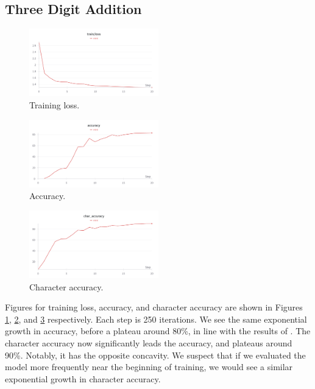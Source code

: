 \documentclass[12pt]{article}
\begin{document}
\subsection{Three Digit Addition}
\begin{figure}[h]
    \centering
    \includegraphics[width=0.5\textwidth]{figures/three-digit/three-digit-add-loss.png}
    \caption{Training loss.}
    \label{fig:three_digit_addition}
\end{figure}
\begin{figure}[h]
    \centering
    \includegraphics[width=0.5\textwidth]{figures/three-digit/three-digit-add-accuracy.png}
    \caption{Accuracy.}
    \label{fig:three_digit_addition_accuracy}
\end{figure}
\begin{figure}[h]
    \centering
    \includegraphics[width=0.5\textwidth]{figures/three-digit/three-digit-add-char-accuracy.png}
    \caption{Character accuracy.}
    \label{fig:three_digit_addition_char_accuracy}
\end{figure}
Figures for training loss, accuracy, and character accuracy are shown in Figures \ref{fig:three_digit_addition}, \ref{fig:three_digit_addition_accuracy}, and \ref{fig:three_digit_addition_char_accuracy} respectively.
Each step is 250 iterations.
We see the same exponential growth in accuracy, before a plateau around 80\%, in line with the results of \cite{lee2023teaching}.
The character accuracy now significantly leads the accuracy, and plateaus around 90\%.
Notably, it has the opposite concavity.
We suspect that if we evaluated the model more frequently near the beginning of training, we would see a similar exponential growth in character accuracy.
\end{document}
